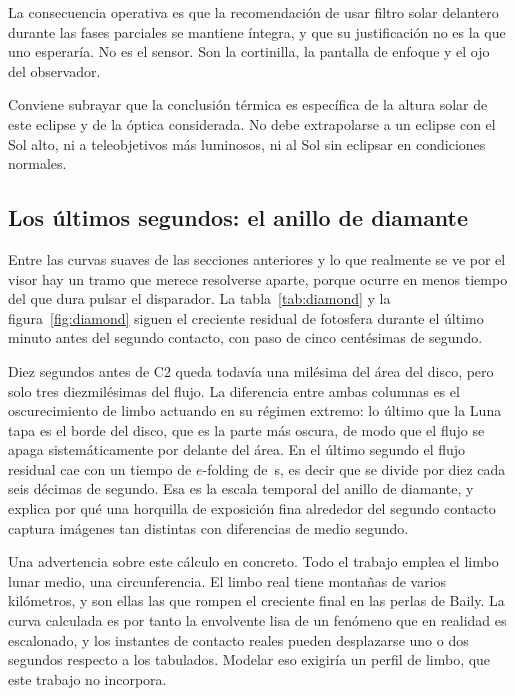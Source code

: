 \documentclass[10pt,a4paper]{article}
\begin{document}
La consecuencia operativa es que la recomendación de usar filtro solar delantero
durante las fases parciales se mantiene íntegra, y que su justificación no es la
que uno esperaría. No es el sensor. Son la cortinilla, la pantalla de enfoque y
el ojo del observador.

Conviene subrayar que la conclusión térmica es específica de la altura solar de
este eclipse y de la óptica considerada. No debe extrapolarse a un eclipse con el Sol
alto, ni a teleobjetivos más luminosos, ni al Sol sin eclipsar en condiciones
normales.

\subsection{Los últimos segundos: el anillo de diamante}

Entre las curvas suaves de las secciones anteriores y lo que realmente se ve por
el visor hay un tramo que merece resolverse aparte, porque ocurre en menos
tiempo del que dura pulsar el disparador. La tabla~\ref{tab:diamond} y la
figura~\ref{fig:diamond} siguen el creciente residual de fotosfera durante el
último minuto antes del segundo contacto, con paso de cinco centésimas de
segundo.

Diez segundos antes de C2 queda todavía una milésima del área del disco, pero
solo tres diezmilésimas del flujo. La diferencia entre ambas columnas es el
oscurecimiento de limbo actuando en su régimen extremo: lo último que la Luna
tapa es el borde del disco, que es la parte más oscura, de modo que el flujo se
apaga sistemáticamente por delante del área. En el último segundo el flujo
residual cae con un tiempo de $e$-folding de \efold\,s, es decir que se divide
por diez cada seis décimas de segundo. Esa es la escala temporal del anillo de
diamante, y explica por qué una horquilla de exposición fina alrededor del
segundo contacto captura imágenes tan distintas con diferencias de medio
segundo.

Una advertencia sobre este cálculo en concreto. Todo el trabajo emplea el limbo
lunar medio, una circunferencia. El limbo real tiene montañas de varios
kilómetros, y son ellas las que rompen el creciente final en las perlas de
Baily. La curva calculada es por tanto la envolvente lisa de un fenómeno que en
realidad es escalonado, y los instantes de contacto reales pueden desplazarse
uno o dos segundos respecto a los tabulados. Modelar eso exigiría un perfil de
limbo, que este trabajo no incorpora.


\end{document}

